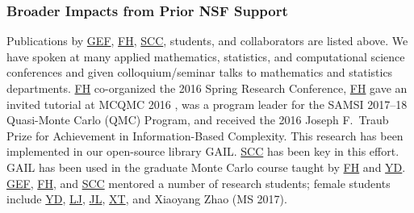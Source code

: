 \documentclass[11pt]{NSFamsart}
\newcommand{\FH}{\hyperlink{FHlink}{FH}\xspace}
\newcommand{\SCTC}{\hyperlink{SCTClink}{SCC}\xspace}
\newcommand{\GEF}{\hyperlink{GEFlink}{GEF}\xspace}
\newcommand{\YD}{\hyperlink{YDlink}{YD}\xspace}
\newcommand{\LJ}{\hyperlink{LJlink}{LJ}\xspace}
\newcommand{\XT}{\hyperlink{XTlink}{XT}\xspace}
\newcommand{\JL}{\hyperlink{JLlink}{JL}\xspace}
\newcommand{\GAIL}{GAIL\xspace}
\begin{document}
\subsubsection{Broader Impacts from Prior NSF Support} \label{prevBIsect}
Publications by \GEF, \FH,  \SCTC, students, and collaborators are listed above.  We have spoken at many applied mathematics, statistics,
and computational science conferences and given colloquium/seminar talks to mathematics and
statistics departments.  \FH co-organized the
2016 Spring Research
Conference, \FH gave an invited tutorial
at MCQMC 2016
\cite{Hic17a}, was a program leader for the SAMSI 2017--18 Quasi-Monte Carlo (QMC) Program, and received the 2016 Joseph F.\ Traub Prize for Achievement in Information-Based Complexity.  This research has been implemented in our open-source library
\GAIL \cite{ChoEtal21a}.  \SCTC has been key in this effort.  \GAIL has been used in the graduate Monte Carlo course taught by \FH and \YD. \GEF, \FH, and \SCTC mentored a number of
research students;  female students include \YD, \LJ, \JL, \XT, and Xiaoyang Zhao (MS 2017).

\end{document}

